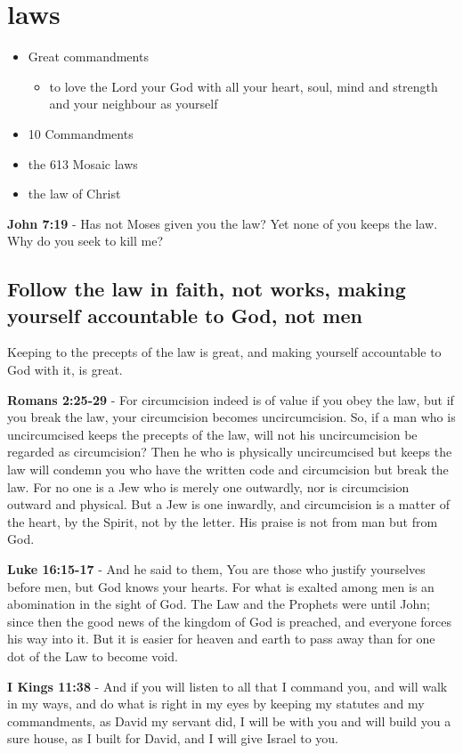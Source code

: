 \documentclass[11pt]{article}
\begin{document}
\section{laws}
\label{sec:org7342634}
\begin{itemize}
\item Great commandments
\begin{itemize}
\item to love the Lord your God with all your heart, soul, mind and strength and your neighbour as yourself
\end{itemize}
\item 10 Commandments
\item the 613 Mosaic laws
\item the law of Christ
\end{itemize}

\textbf{John 7:19} - Has not Moses given you the law? Yet none of you keeps the law. Why do you seek to kill me?

\subsection{Follow the law in faith, not works, making yourself accountable to God, not men}
\label{sec:orgb864b63}
Keeping to the precepts of the law is great, and making yourself accountable to God with it, is great.

\textbf{Romans 2:25-29} - For circumcision indeed is of value if you obey the law, but if you break the law, your circumcision becomes uncircumcision. So, if a man who is uncircumcised keeps the precepts of the law, will not his uncircumcision be regarded as circumcision? Then he who is physically uncircumcised but keeps the law will condemn you who have the written code and circumcision but break the law. For no one is a Jew who is merely one outwardly, nor is circumcision outward and physical. But a Jew is one inwardly, and circumcision is a matter of the heart, by the Spirit, not by the letter. His praise is not from man but from God.

\textbf{Luke 16:15-17} - And he said to them, You are those who justify yourselves before men, but God knows your hearts. For what is exalted among men is an abomination in the sight of God.  The Law and the Prophets were until John; since then the good news of the kingdom of God is preached, and everyone forces his way into it.  But it is easier for heaven and earth to pass away than for one dot of the Law to become void.

\textbf{I Kings 11:38} - And if you will listen to all that I command you, and will walk in my ways, and do what is right in my eyes by keeping my statutes and my commandments, as David my servant did, I will be with you and will build you a sure house, as I built for David, and I will give Israel to you.
\end{document}
